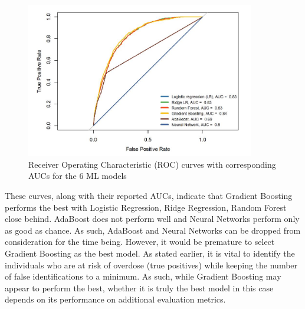 \documentclass[twoside,10.5pt]{article}
\begin{document}
\begin{figure}[htp]
\centering
\includegraphics[width=10cm]{images/auc_curves.JPG}
\caption{Receiver Operating Characteristic (ROC) curves with corresponding AUCs for the 6 ML models}
\label{fig:auc_curves}
\end{figure}

These curves, along with their reported AUCs, indicate that Gradient Boosting performs the best with Logistic Regression, Ridge Regression, Random Forest close behind. AdaBoost does not perform well and Neural Networks perform only as good as chance. As such, AdaBoost and Neural Networks can be dropped from consideration for the time being. However, it would be premature to select Gradient Boosting as the best model. As stated earlier, it is vital to identify the individuals who are at risk of overdose (true positives) while keeping the number of false identifications to a minimum. As such, while Gradient Boosting may appear to perform the best, whether it is truly the best model in this case depends on its performance on additional evaluation metrics. 

\begin{table}[h!]
  \begin{center}
    \caption{Evaluation Metrics of the Machine Learning Models}
    \label{tab:metrics}
  \end{center}
\end{table}
\end{document}
